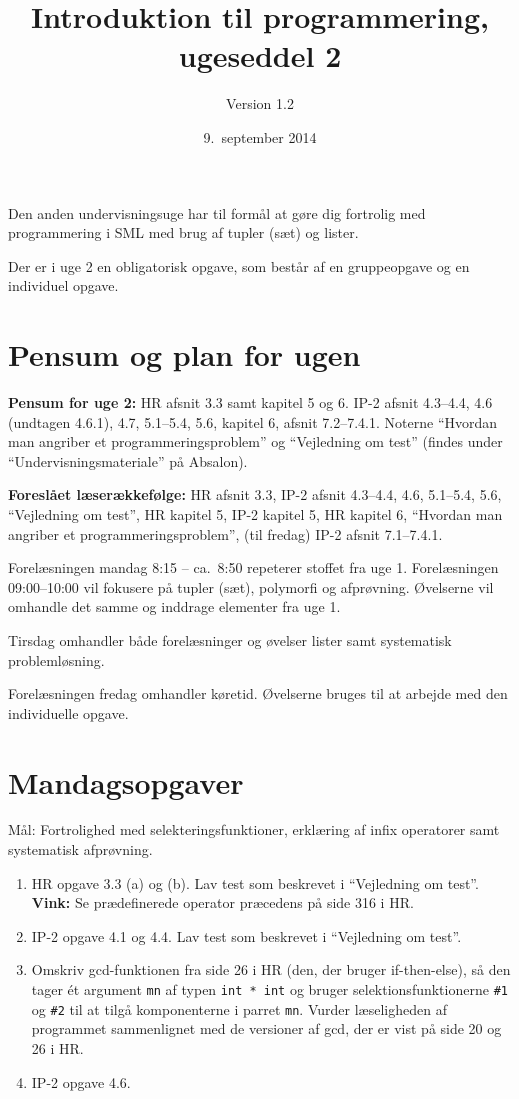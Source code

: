 \documentclass[a4paper,12pt]{article}
\title{Introduktion til programmering, ugeseddel 2}
\author{Version 1.2}%
\date{9.\ september 2014}
\begin{document}
\maketitle{}

Den anden undervisningsuge har til formål at gøre dig fortrolig med
programmering i SML med brug af tupler (sæt) og lister.

Der er i uge 2 en obligatorisk opgave, som består af en
gruppeopgave og en individuel opgave.


\section{Pensum og plan for ugen}
\label{sec:pensum-og-plan}


\textbf{Pensum for uge 2:} HR afsnit 3.3 samt kapitel 5 og 6.  IP-2
afsnit 4.3--4.4, 4.6 (undtagen 4.6.1), 4.7, 5.1--5.4, 5.6, kapitel 6,
afsnit 7.2--7.4.1.  Noterne ``Hvordan man angriber et
programmeringsproblem'' og ``Vejledning om test'' (findes under
``Undervisningsmateriale'' på Absalon).

\textbf{Foreslået læserækkefølge:} HR afsnit 3.3, IP-2 afsnit
4.3--4.4, 4.6, 5.1--5.4, 5.6, ``Vejledning om test'', HR kapitel 5,
IP-2 kapitel 5, HR kapitel 6, ``Hvordan man angriber et
programmeringsproblem'', (til fredag) IP-2 afsnit 7.1--7.4.1.

Forelæsningen mandag 8:15 -- ca.\ 8:50 repeterer stoffet fra uge 1.
Forelæsningen 09:00--10:00 vil fokusere på tupler (sæt), polymorfi og
afprøvning.  Øvelserne vil omhandle det samme og inddrage elementer
fra uge 1.

Tirsdag omhandler både forelæsninger og øvelser lister samt
systematisk problemløsning.

Forelæsningen fredag omhandler køretid.  Øvelserne bruges til at
arbejde med den individuelle opgave.


\section{Mandagsopgaver}
\label{sec:mandagsopgaver}

Mål: Fortrolighed med selekteringsfunktioner, erklæring af infix
operatorer samt systematisk afprøvning.

\begin{enumerate}[{2}M1]
\item HR opgave 3.3 (a) og (b).  Lav test som beskrevet i ``Vejledning
  om test''. \textbf{Vink:} Se prædefinerede operator præcedens på side
  316 i HR.
\item IP-2 opgave 4.1 og 4.4.  Lav test som beskrevet i ``Vejledning
  om test''.
\item Omskriv gcd-funktionen fra side 26 i HR (den, der bruger
  if-then-else), så den tager ét argument \texttt{mn} af typen
  \texttt{int\,*\,int} og bruger selektionsfunktionerne \texttt{\#1}
  og \texttt{\#2} til at tilgå komponenterne i parret \texttt{mn}.
  Vurder læseligheden af programmet sammenlignet med de versioner af
  gcd, der er vist på side 20 og 26 i HR.
\item IP-2 opgave 4.6.
\end{enumerate}
\end{document}
